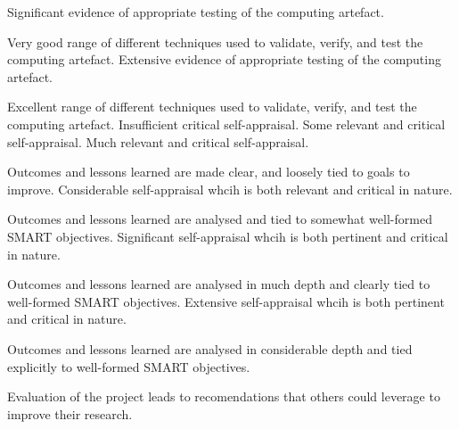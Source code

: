 \begin{markingrubric}
        \grade		Significant evidence of appropriate testing of the computing artefact.
        \par		Very good range of different techniques used to validate, verify, and test the computing artefact.
        \grade		Extensive evidence of appropriate testing of the computing artefact.
        \par		Excellent range of different techniques used to validate, verify, and test the computing artefact.
%
        \grade\fail  	Insufficient critical self-appraisal.
        \grade		Some relevant and critical self-appraisal.
        \grade		Much relevant and critical self-appraisal.
        \par		Outcomes and lessons learned are made clear, and loosely tied to goals to improve.
        \grade		Considerable self-appraisal whcih is both relevant and critical in nature.
        \par		Outcomes and lessons learned are analysed and tied to somewhat well-formed SMART objectives.
        \grade		Significant self-appraisal whcih is both pertinent and critical in nature.
        \par		Outcomes and lessons learned are analysed in much depth and clearly tied to well-formed SMART objectives.
        \grade		Extensive self-appraisal whcih is both pertinent and critical in nature.
        \par		Outcomes and lessons learned are analysed in considerable depth and tied explicitly to well-formed SMART objectives. 
       \par		Evaluation of the project leads to recomendations that others could leverage to improve their research. 
\end{markingrubric}


